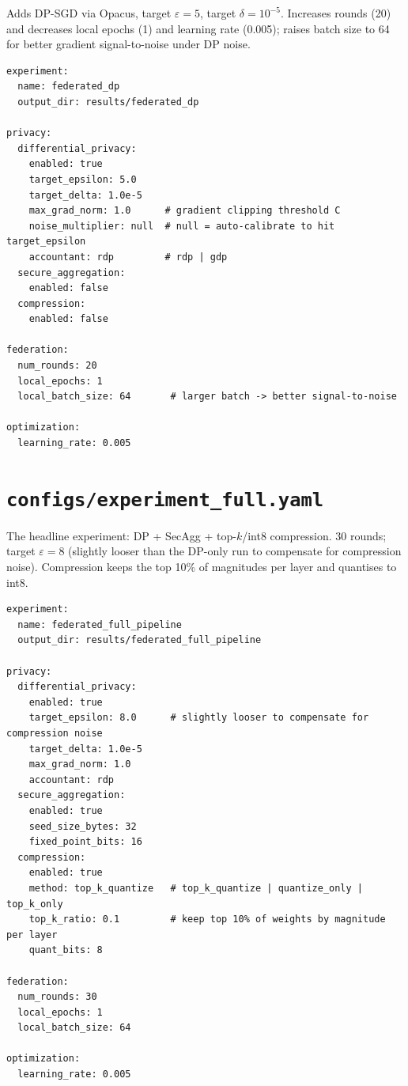 \documentclass[11pt,a4paper]{report}
\begin{document}
Adds DP-SGD via Opacus, target $\varepsilon = 5$, target $\delta =
10^{-5}$. Increases rounds (20) and decreases local epochs (1) and
learning rate (0.005); raises batch size to 64 for better gradient
signal-to-noise under DP noise.

\begin{verbatim}
experiment:
  name: federated_dp
  output_dir: results/federated_dp

privacy:
  differential_privacy:
    enabled: true
    target_epsilon: 5.0
    target_delta: 1.0e-5
    max_grad_norm: 1.0      # gradient clipping threshold C
    noise_multiplier: null  # null = auto-calibrate to hit target_epsilon
    accountant: rdp         # rdp | gdp
  secure_aggregation:
    enabled: false
  compression:
    enabled: false

federation:
  num_rounds: 20
  local_epochs: 1
  local_batch_size: 64       # larger batch -> better signal-to-noise

optimization:
  learning_rate: 0.005
\end{verbatim}

\section{\texttt{configs/experiment\_full.yaml}}\label{app:cfg-full}

The headline experiment: DP + SecAgg + top-$k$/int8 compression. 30
rounds; target $\varepsilon = 8$ (slightly looser than the DP-only run
to compensate for compression noise). Compression keeps the top 10\%
of magnitudes per layer and quantises to int8.

\begin{verbatim}
experiment:
  name: federated_full_pipeline
  output_dir: results/federated_full_pipeline

privacy:
  differential_privacy:
    enabled: true
    target_epsilon: 8.0      # slightly looser to compensate for compression noise
    target_delta: 1.0e-5
    max_grad_norm: 1.0
    accountant: rdp
  secure_aggregation:
    enabled: true
    seed_size_bytes: 32
    fixed_point_bits: 16
  compression:
    enabled: true
    method: top_k_quantize   # top_k_quantize | quantize_only | top_k_only
    top_k_ratio: 0.1         # keep top 10% of weights by magnitude per layer
    quant_bits: 8

federation:
  num_rounds: 30
  local_epochs: 1
  local_batch_size: 64

optimization:
  learning_rate: 0.005
\end{verbatim}
\end{document}
